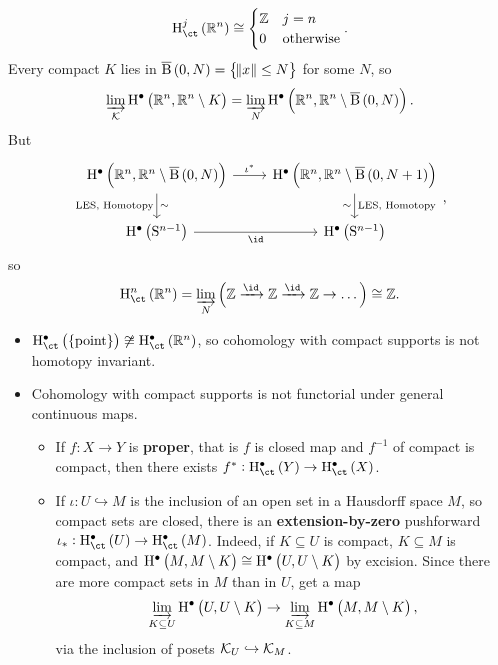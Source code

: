 \begin{example*}
$$ \Hc^j\br{\RR^n} \cong
\begin{cases}
\ZZ & j = n \\
0 & \text{otherwise}
\end{cases}.
$$
Every compact $ K $ lies in $ \overline{\B}\br{0, N} = \cbr{\norm{x} \le N} $ for some $ N $, so
$$ \varinjlim_\KKK \H^\bullet\br{\RR^n, \RR^n \setminus K} = \varinjlim_N \H^\bullet\br{\RR^n, \RR^n \setminus \overline{\B}\br{0, N}}. $$
But
$$
\begin{tikzcd}
\H^\bullet\br{\RR^n, \RR^n \setminus \overline{\B}\br{0, N}} \arrow{r}{\iota^*} \arrow{d}{\sim}[swap]{\text{LES, Homotopy}} & \H^\bullet\br{\RR^n, \RR^n \setminus \overline{\B}\br{0, N + 1}} \arrow{d}{\text{LES, Homotopy}}[swap]{\sim} \\
\H^\bullet\br{\S^{n - 1}} \arrow{r}[swap]{\id} & \H^\bullet\br{\S^{n - 1}}
\end{tikzcd},
$$
so
$$ \Hc^n\br{\RR^n} = \varinjlim_N \br{\ZZ \xrightarrow{\id} \ZZ \xrightarrow{\id} \ZZ \to \dots} \cong \ZZ. $$
\end{example*}

\begin{remark*}
\hfill
\begin{itemize}
\item $ \Hc^\bullet\br{\pt} \not\cong \Hc^\bullet\br{\RR^n} $, so cohomology with compact supports is not homotopy invariant.
\item Cohomology with compact supports is not functorial under general continuous maps.
\begin{itemize}
\item If $ f : X \to Y $ is \textbf{proper}, that is $ f $ is closed map and $ f^{-1} $ of compact is compact, then there exists $ f^* : \Hc^\bullet\br{Y} \to \Hc^{\bullet}\br{X} $.
\item If $ \iota : U \hookrightarrow M $ is the inclusion of an open set in a Hausdorff space $ M $, so compact sets are closed, there is an \textbf{extension-by-zero} pushforward $ \iota_* : \Hc^\bullet\br{U} \to \Hc^\bullet\br{M} $. Indeed, if $ K \subseteq U $ is compact, $ K \subseteq M $ is compact, and $ \H^\bullet\br{M, M \setminus K} \cong \H^\bullet\br{U, U \setminus K} $ by excision. Since there are more compact sets in $ M $ than in $ U $, get a map
$$ \varinjlim_{K \subseteq U} \H^\bullet\br{U, U \setminus K} \to \varinjlim_{K \subseteq M} \H^\bullet\br{M, M \setminus K}, $$
via the inclusion of posets $ \mathcal{K}_U \hookrightarrow \mathcal{K}_M $.
\end{itemize}
\end{itemize}
\end{remark*}

